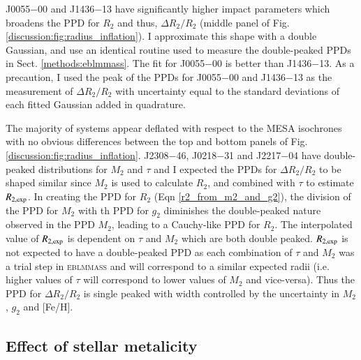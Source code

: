 J0055$-$00 and J1436$-$13 have significantly higher impact parameters which broadens the PPD for $R_2$ and thus, $\Delta R_2 / R_2$ (middle panel of Fig. \ref{discussion:fig:radius_inflation}). I approximate this shape with a double Gaussian, and use an identical routine used to measure the double-peaked PPDs in Sect. \ref{methods:eblmmass}. The fit for J0055$-$00 is better than J1436$-$13. As a precaution, I used the peak of the PPDs for  J0055$-$00 and J1436$-$13 as the measurement of $\Delta R_2 / R_2$ with uncertainty equal to the standard deviations of each fitted Gaussian added in quadrature. 

The majority of systems appear deflated with respect to the MESA isochrones with no obvious differences between the top and bottom panels of Fig. \ref{discussion:fig:radius_inflation}. J2308$-$46, J0218$-$31 and J2217$-$04 have double-peaked distributions for $M_2$ and $\tau$ and I expected the PPDs for $\Delta R_2 / R_2$ to be shaped similar since $M_2$ is used to calculate $R_2$, and combined with $\tau$ to estimate $R_{\rm 2,exp}$. In creating the PPD for $R_2$ (Eqn \ref{r2_from_m2_and_g2}), the division of the PPD for $M_2$ with th PPD for $g_2$ diminishes the double-peaked nature observed in the PPD $M_2$, leading to a Cauchy-like PPD for $R_2$. The interpolated value of $R_{2, \rm exp}$ is dependent on $\tau$ and $M_2$ which are both double peaked. $R_{2, \rm exp}$ is not expected to have a double-peaked PPD as each combination of $\tau$ and $M_2$ was a trial step in \textsc{eblmmass} and will correspond to a similar expected radii (i.e. higher values of $\tau$ will correspond to lower values of $M_2$ and vice-versa). Thus the PPD for $\Delta R_2 / R_2$ is single peaked with width controlled by the uncertainty in $M_2$, $g_2$ and [Fe/H]. 










\subsection{Effect of stellar metalicity}

